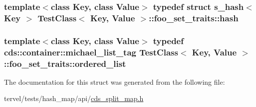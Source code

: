 \subsubsection[{hash}]{\setlength{\rightskip}{0pt plus 5cm}template$<$class Key, class Value$>$ typedef struct {\bf s\+\_\+hash}$<$ Key $>$ {\bf Test\+Class}$<$ Key, {\bf Value} $>$\+::{\bf foo\+\_\+set\+\_\+traits\+::hash}}\label{struct_test_class_1_1foo__set__traits_a5e8da11bd322076d626508eb728c8518}
\hypertarget{struct_test_class_1_1foo__set__traits_a9cbc3585bd646618faf9f6a28d5a1133}{}
\subsubsection[{ordered\+\_\+list}]{\setlength{\rightskip}{0pt plus 5cm}template$<$class Key, class Value$>$ typedef cds\+::container\+::michael\+\_\+list\+\_\+tag {\bf Test\+Class}$<$ Key, {\bf Value} $>$\+::{\bf foo\+\_\+set\+\_\+traits\+::ordered\+\_\+list}}\label{struct_test_class_1_1foo__set__traits_a9cbc3585bd646618faf9f6a28d5a1133}


The documentation for this struct was generated from the following file\+:\begin{DoxyCompactItemize}
\item 
tervel/tests/hash\+\_\+map/api/\hyperlink{cds__split__map_8h}{cds\+\_\+split\+\_\+map.\+h}\end{DoxyCompactItemize}
